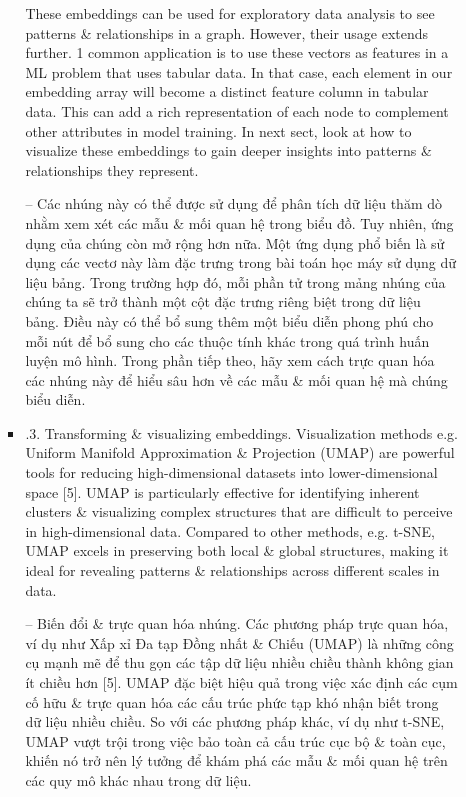 \documentclass{article}
\begin{document}
\begin{itemize}
\begin{itemize}
\begin{itemize}
           These embeddings can be used for exploratory data analysis to see patterns \& relationships in a graph. However, their usage extends further. 1 common application is to use these vectors as features in a ML problem that uses tabular data. In that case, each element in our embedding array will become a distinct feature column in tabular data. This can add a rich representation of each node to complement other attributes in model training. In next sect, look at how to visualize these embeddings to gain deeper insights into patterns \& relationships they represent.

           -- Các nhúng này có thể được sử dụng để phân tích dữ liệu thăm dò nhằm xem xét các mẫu \& mối quan hệ trong biểu đồ. Tuy nhiên, ứng dụng của chúng còn mở rộng hơn nữa. Một ứng dụng phổ biến là sử dụng các vectơ này làm đặc trưng trong bài toán học máy sử dụng dữ liệu bảng. Trong trường hợp đó, mỗi phần tử trong mảng nhúng của chúng ta sẽ trở thành một cột đặc trưng riêng biệt trong dữ liệu bảng. Điều này có thể bổ sung thêm một biểu diễn phong phú cho mỗi nút để bổ sung cho các thuộc tính khác trong quá trình huấn luyện mô hình. Trong phần tiếp theo, hãy xem cách trực quan hóa các nhúng này để hiểu sâu hơn về các mẫu \& mối quan hệ mà chúng biểu diễn.
           \item {.3. Transforming \& visualizing embeddings.} Visualization methods e.g. Uniform Manifold Approximation \& Projection (UMAP) are powerful tools for reducing high-dimensional datasets into lower-dimensional space [5]. UMAP is particularly effective for identifying inherent clusters \& visualizing complex structures that are difficult to perceive in high-dimensional data. Compared to other methods, e.g. t-SNE, UMAP excels in preserving both local \& global structures, making it ideal for revealing patterns \& relationships across different scales in data.

           -- {\sf Biến đổi \& trực quan hóa nhúng.} Các phương pháp trực quan hóa, ví dụ như Xấp xỉ Đa tạp Đồng nhất \& Chiếu (UMAP) là những công cụ mạnh mẽ để thu gọn các tập dữ liệu nhiều chiều thành không gian ít chiều hơn [5]. UMAP đặc biệt hiệu quả trong việc xác định các cụm cố hữu \& trực quan hóa các cấu trúc phức tạp khó nhận biết trong dữ liệu nhiều chiều. So với các phương pháp khác, ví dụ như t-SNE, UMAP vượt trội trong việc bảo toàn cả cấu trúc cục bộ \& toàn cục, khiến nó trở nên lý tưởng để khám phá các mẫu \& mối quan hệ trên các quy mô khác nhau trong dữ liệu.


\end{itemize}
\end{itemize}
\end{itemize}
\end{document}

